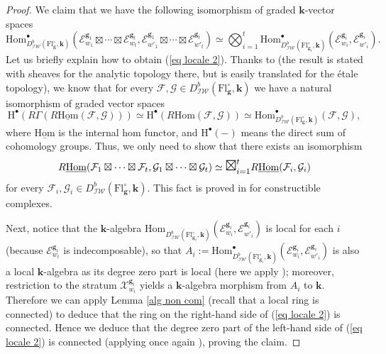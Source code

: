\documentclass[11pt]{amsart}
\theoremstyle{plain}
\theoremstyle{remark}
\numberwithin{equation}{section}
\begin{document}
\begin{proof}
		We claim that we have the following isomorphism of graded $\mathbf{k}$-vector spaces
		\begin{equation}
			\mathrm{Hom}_{D^b_{\mathcal{IW}}(\mathrm{Fl}^{\circ}_{\mathbf{g}},\mathbf{k}) }^\bullet(\mathcal{E}_{w_1}^{\mathbf{g}_1}\boxtimes\cdots \boxtimes\mathcal{E}_{w_t}^{\mathbf{g}_t},\mathcal{E}_{w'_1}^{\mathbf{g}_1}\boxtimes\cdots \boxtimes\mathcal{E}_{w'_t}^{\mathbf{g}_t})\simeq \bigotimes_{i=1}^t\mathrm{Hom}_{D^b_{\mathcal{IW}}(\mathrm{Fl}^{\circ}_{\mathbf{g}_i},\mathbf{k})}^\bullet(\mathcal{E}_{w_i}^{\mathbf{g}_i},\mathcal{E}_{w'_i}^{\mathbf{g}_i}).\label{eq locale 2}
		\end{equation}
		Let us briefly explain how to obtain (\ref{eq locale 2}). Thanks to \cite[Proposition 1.4.6]{achar2021perverse} (the result is stated with sheaves for the analytic topology there, but is easily translated for the \'etale topology), we know that for every $\mathcal{F},\mathcal{G}\in D^b_{\mathcal{IW}}(\mathrm{Fl}^{\circ}_{\mathbf{g}},\mathbf{k})$ we have a natural isomorphism of graded vector spaces
		\begin{equation}\label{Rhom}
			\mathrm{H}^\bullet(R\Gamma(R\underline{\mathrm{Hom}}(\mathcal{F},\mathcal{G})))\simeq \mathrm{H}^\bullet(R\mathrm{Hom}(\mathcal{F},\mathcal{G}))\simeq \mathrm{Hom}_{D^b_{\mathcal{IW}}(\mathrm{Fl}^{\circ}_{\mathbf{g}},\mathbf{k})}^\bullet(\mathcal{F},\mathcal{G}), 
		\end{equation}
		where $\underline{\mathrm{Hom}}$ is the internal hom functor, and $\mathrm{H}^\bullet(-)$ means the direct sum of cohomology groups. Thus, we only need to show that there exists an isomorphism $$R\underline{\mathrm{Hom}}(\mathcal{F}_1\boxtimes\cdots \boxtimes\mathcal{F}_t,\mathcal{G}_1\boxtimes\cdots \boxtimes\mathcal{G}_t)\simeq \mathlarger{\mathlarger{\boxtimes}}_{i=1}^tR\underline{\mathrm{Hom}}(\mathcal{F}_i,\mathcal{G}_i)$$
		for every $\mathcal{F}_i,\mathcal{G}_i\in D^b_{\mathcal{IW}}(\mathrm{Fl}^{\circ}_{\mathbf{g}},\mathbf{k})$. This fact is proved in \cite[§4.2.7(b)]{beilinson2018faisceaux} for constructible complexes. 
		
		Next, notice that the $\mathbf{k}$-algebra $\mathrm{Hom}_{D^b_{\mathcal{IW}}(\mathrm{Fl}^{\circ}_{\mathbf{g}_i},\mathbf{k})}(\mathcal{E}_{w_i}^{\mathbf{g}_i},\mathcal{E}_{w'_i}^{\mathbf{g}_i})$ is local for each $i$ (because $\mathcal{E}_{w_i}^{\mathbf{g}_i}$ is indecomposable), so that $A_i:=\mathrm{Hom}^\bullet_{D^b_{\mathcal{IW}}(\mathrm{Fl}^{\circ}_{\mathbf{g}_i},\mathbf{k})}(\mathcal{E}_{w_i}^{\mathbf{g}_i},\mathcal{E}_{w'_i}^{\mathbf{g}_i})$ is also a local $\mathbf{k}$-algebra as its degree zero part is local (here we apply \cite[Theorem 3.1]{gordon1982graded}); moreover, restriction to the stratum $\mathscr{X}^{\mathbf{g}_i}_{w_i}$ yields a $\mathbf{k}$-algebra morphism from $A_i$ to $\mathbf{k}$. Therefore we can apply Lemma \ref{alg non com} (recall that a local ring is connected) to deduce that the ring on the right-hand side of (\ref{eq locale 2}) is connected. Hence we deduce that the degree zero part of the left-hand side of (\ref{eq locale 2}) is connected (applying once again \cite[Theorem 3.1]{gordon1982graded}), proving the claim.
		

\end{proof}
\end{document}
